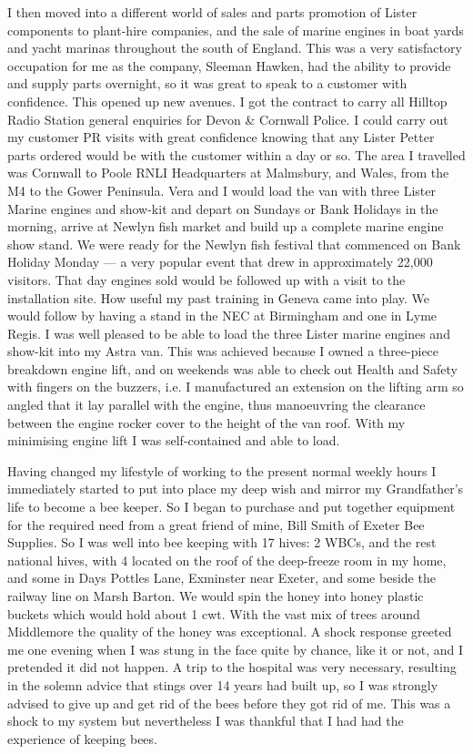 I then moved into a different world of sales and parts promotion of Lister
components to plant-hire companies, and the sale of marine engines in boat
yards and yacht marinas throughout the south of England. This was a very
satisfactory occupation for me as the company, Sleeman Hawken, had the ability
to provide and supply parts overnight, so it was great to speak to a customer
with confidence. This opened up new avenues. I got the contract to carry all
Hilltop Radio Station general enquiries for Devon \& Cornwall Police. I could
carry out my customer PR visits with great confidence knowing that any Lister
Petter parts ordered would be with the customer within a day or so. The area I
travelled was Cornwall to Poole RNLI Headquarters at Malmsbury, and Wales, from
the M4 to the Gower Peninsula. Vera and I would load the van with three Lister
Marine engines and show-kit and depart on Sundays or Bank Holidays in the
morning, arrive at Newlyn fish market and build up a complete marine engine
show stand. We were ready for the Newlyn fish festival that commenced on Bank
Holiday Monday --- a very popular event that drew in approximately 22,000
visitors. That day engines sold would be followed up with a visit to the
installation site. How useful my past training in Geneva came into play. We
would follow by having a stand in the NEC at Birmingham and one in Lyme Regis.
I was well pleased to be able to load the three Lister marine engines and
show-kit into my Astra van. This was achieved because I owned a three-piece
breakdown engine lift, and on weekends was able to check out Health and Safety
with fingers on the buzzers, i.e. I manufactured an extension on the lifting
arm so angled that it lay parallel with the engine, thus manoeuvring the
clearance between the engine rocker cover to the height of the van roof. With
my minimising engine lift I was self-contained and able to load.

Having changed my lifestyle of working to the present normal weekly hours I
immediately started to put into place my deep wish and mirror my Grandfather's
life to become a bee keeper. So I began to purchase and put together equipment
for the required need from a great friend of mine, Bill Smith of Exeter Bee
Supplies. So I was well into bee keeping with 17 hives: 2 WBCs, and the rest
national hives, with 4 located on the roof of the deep-freeze room in my home,
and some in Days Pottles Lane, Exminster near Exeter, and some beside the
railway line on Marsh Barton. We would spin the honey into honey plastic
buckets which would hold about 1 cwt. With the vast mix of trees around
Middlemore the quality of the honey was exceptional. A shock response greeted
me one evening when I was stung in the face quite by chance, like it or not,
and I pretended it did not happen. A trip to the hospital was very necessary,
resulting in the solemn advice that stings over 14 years had built up, so I was
strongly advised to give up and get rid of the bees before they got rid of me.
This was a shock to my system but nevertheless I was thankful that I had had
the experience of keeping bees.


